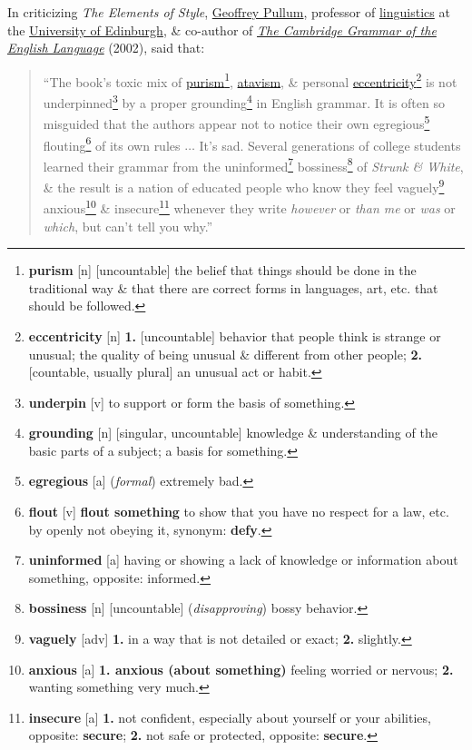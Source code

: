 \documentclass{article}
\begin{document}
In criticizing {\it The Elements of Style}, \href{https://en.wikipedia.org/wiki/Geoffrey_Pullum}{Geoffrey Pullum}, professor of \href{https://en.wikipedia.org/wiki/Linguistics}{linguistics} at the \href{https://en.wikipedia.org/wiki/University_of_Edinburgh}{University of Edinburgh}, \& co-author of \href{https://en.wikipedia.org/wiki/The_Cambridge_Grammar_of_the_English_Language}{{\it The Cambridge Grammar of the English Language}} (2002), said that:
\begin{quotation}
	``The book's toxic mix of \href{https://en.wikipedia.org/wiki/Linguistic_purism}{purism}\footnote{{\bf purism} [n] [uncountable] the belief that things should be done in the traditional way \& that there are correct forms in languages, art, etc. that should be followed.}, \href{https://en.wikipedia.org/wiki/Atavism}{atavism}, \& personal \href{https://en.wikipedia.org/wiki/Eccentricity_(behavior)}{eccentricity}\footnote{{\bf eccentricity} [n] {\bf 1.} [uncountable] behavior that people think is strange or unusual; the quality of being unusual \& different from other people; {\bf 2.} [countable, usually plural] an unusual act or habit.} is not underpinned\footnote{{\bf underpin} [v] to support or form the basis of something.} by a proper grounding\footnote{{\bf grounding} [n] [singular, uncountable] knowledge \& understanding of the basic parts of a subject; a basis for something.} in English grammar. It is often so misguided that the authors appear not to notice their own egregious\footnote{{\bf egregious} [a] ({\it formal}) extremely bad.} flouting\footnote{{\bf flout} [v] {\bf flout something} to show that you have no respect for a law, etc. by openly not obeying it, {\sc synonym}: {\bf defy}.} of its own rules $\ldots$ It's sad. Several generations of college students learned their grammar from the uninformed\footnote{{\bf uninformed} [a] having or showing a lack of knowledge or information about something, {\sc opposite}: informed.} bossiness\footnote{{\bf bossiness} [n] [uncountable] ({\it disapproving}) bossy behavior.} of {\it Strunk \& White}, \& the result is a nation of educated people who know they feel vaguely\footnote{{\bf vaguely} [adv] {\bf 1.} in a way that is not detailed or exact; {\bf 2.} slightly.} anxious\footnote{{\bf anxious} [a] {\bf 1. anxious (about something)} feeling worried or nervous; {\bf 2.} wanting something very much.} \& insecure\footnote{{\bf insecure} [a] {\bf 1.} not confident, especially about yourself or your abilities, {\sc opposite}: {\bf secure}; {\bf 2.} not safe or protected, {\sc opposite}: {\bf secure}.} whenever they write {\it however} or {\it than me} or {\it was} or {\it which}, but can't tell you why.''
\end{quotation}
\end{document}
